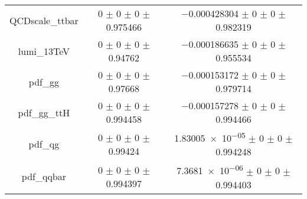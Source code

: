 \begin{table}
\begin{tabular}{ccc}
QCDscale\_ttbar & \num{0} $\pm$ \num{0} $\pm$ \num{0} $\pm$ \num{0.975466} & \num{-0.000428304} $\pm$ \num{0} $\pm$ \num{0} $\pm$ \num{0.982319}\\
lumi\_13TeV & \num{0} $\pm$ \num{0} $\pm$ \num{0} $\pm$ \num{0.94762} & \num{-0.000186635} $\pm$ \num{0} $\pm$ \num{0} $\pm$ \num{0.955534}\\
pdf\_gg & \num{0} $\pm$ \num{0} $\pm$ \num{0} $\pm$ \num{0.97668} & \num{-0.000153172} $\pm$ \num{0} $\pm$ \num{0} $\pm$ \num{0.979714}\\
pdf\_gg\_ttH & \num{0} $\pm$ \num{0} $\pm$ \num{0} $\pm$ \num{0.994458} & \num{-0.000157278} $\pm$ \num{0} $\pm$ \num{0} $\pm$ \num{0.994466}\\
pdf\_qg & \num{0} $\pm$ \num{0} $\pm$ \num{0} $\pm$ \num{0.99424} & \num{1.83005e-05} $\pm$ \num{0} $\pm$ \num{0} $\pm$ \num{0.994248}\\
pdf\_qqbar & \num{0} $\pm$ \num{0} $\pm$ \num{0} $\pm$ \num{0.994397} & \num{7.3681e-06} $\pm$ \num{0} $\pm$ \num{0} $\pm$ \num{0.994403}\\
\bottomrule
\end{tabular}
\end{table}